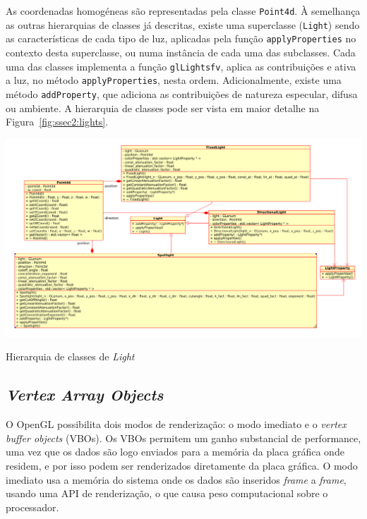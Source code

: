 As coordenadas homogéneas são representadas pela classe \texttt{Point4d}.
À semelhança as outras hierarquias de classes já descritas, existe uma
superclasse (\texttt{Light}) sendo as características de cada tipo de luz,
aplicadas pela função \texttt{applyProperties} no contexto desta superclasse, ou
numa instância de cada uma das subclasses. Cada uma das classes implementa
a função \texttt{glLightsfv}, aplica as contribuições e ativa a luz, no método
\texttt{applyProperties}, nesta ordem. Adicionalmente, existe uma método
\texttt{addProperty}, que adiciona as contribuições de natureza especular,
difusa ou ambiente. A hierarquia de classes pode ser vista em maior detalhe na
Figura~\ref{fig:ssec2:lights}.


\begin{center} 	
\includegraphics[width=\textwidth,height=\textheight,keepaspectratio]{resources/light.png}
\captionsetup{type=figure, width=0.8\linewidth}
\caption{Hierarquia de classes de \emph{Light}} 
\label{fig:ssec2:lights} 
\end{center}


\subsection{\emph{Vertex Array Objects}}

O OpenGL possibilita dois modos de renderização: o modo imediato
e o \emph{vertex buffer objects} (VBOs). Os VBOs permitem um ganho substancial
de performance, uma vez que os dados são logo enviados para a memória da placa
gráfica onde residem, e por isso podem ser renderizados diretamente da placa
gráfica. O modo imediato usa a memória do sistema onde os dados são inseridos
\emph{frame} a \emph{frame}, usando uma API de renderização, o que causa peso
computacional sobre o processador.


